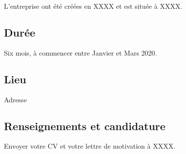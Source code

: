 \documentclass[12pt, a4paper]{article}
\begin{document}
L'entreprise ont été créées en XXXX et est située à XXXX.

\subsection*{Durée}

Six mois, à commencer entre Janvier et Mars 2020.

\subsection*{Lieu}

Adresse

\subsection*{Renseignements et candidature}

Envoyer votre CV et votre lettre de motivation à XXXX.
\end{document}
